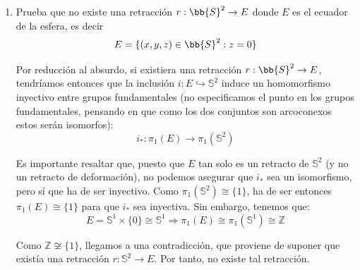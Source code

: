 \documentclass[12pt]{article}
\begin{document}
\begin{ejercicio}
\begin{enumerate}[label=\alph*)]
                Como $x_0\in \mathbb{S}^2$, tenemos que $\|x_0\|=1$, luego $x_0\neq 0$ y, por tanto, $x_0\neq -x_0$. Por tanto, la aplicación $f$ no es inyectiva, lo que contradice nuestra hipótesis. Hemos llegado a una contradicción, por lo que $f$ ha de ser sobreyectiva.
            \item Prueba que no existe una retracción $r:\bb{S}^2\to E$ donde $E$ es el ecuador de la esfera, es decir
                \begin{equation*}
                    E = \{(x,y,z) \in \bb{S}^2 : z=0\}
                \end{equation*}

                Por reducción al absurdo, si existiera una retracción $r:\bb{S}^2\to E$, tendríamos entonces que la inclusión $i:E\hookrightarrow \mathbb{S}^2$ induce un homomorfismo inyectivo entre grupos fundamentales (no especificamos el punto en los grupos fundamentales, pensando en que como los dos conjuntos son arcoconexos estos serán isomorfos):
                \begin{equation*}
                    i_\ast:\pi_1(E) \to \pi_1\left(\mathbb{S}^2\right)
                \end{equation*}

                Es importante resaltar que, puesto que $E$ tan solo es un retracto de $\mathbb{S}^2$ (y no un retracto de deformación), no podemos asegurar que $i_\ast$ sea un isomorfismo, pero sí que ha de ser inyectivo. Como $\pi_1\left(\mathbb{S}^2\right)\cong\{1\}$, ha de ser entonces $\pi_1(E)\cong\{1\}$ para que $i_\ast$ sea inyectiva. Sin embargo, tenemos que:
                \begin{equation*}
                    E = \mathbb{S}^1\times \{0\} \cong \mathbb{S}^1
                    \Longrightarrow \pi_1(E)\cong \pi_1(\mathbb{S}^1) \cong \mathbb{Z}
                \end{equation*}
                
                Como $\mathbb{Z}\not\cong \{1\}$, llegamos a una contradicción, que proviene de suponer que existía una retracción $r:\mathbb{S}^2\to E$. Por tanto, no existe tal retracción.
        \end{enumerate}
    \end{ejercicio}
\end{document}
